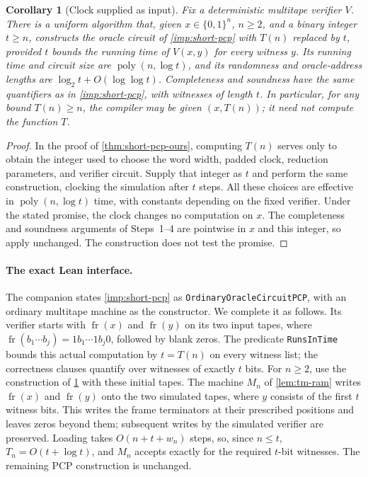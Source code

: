\documentclass[11pt,letterpaper]{article}
\newtheorem{corollary}[theorem]{Corollary}
\theoremstyle{definition}
\theoremstyle{remark}
\newcommand{\poly}{\operatorname{poly}}
\begin{document}
\begin{corollary}[Clock supplied as input]\label{cor:short-pcp-clock}
Fix a deterministic multitape verifier \(V\). There is a uniform
algorithm that, given \(x\in\{0,1\}^n\), \(n\ge2\), and a binary integer
\(t\ge n\), constructs the oracle circuit of
\cref{imp:short-pcp} with \(T(n)\) replaced by \(t\), provided \(t\)
bounds the running time of \(V(x,y)\) for every witness \(y\).
Its running time and circuit size are \(\poly(n,\log t)\), and its
randomness and oracle-address lengths are
\(\log_2t+O(\log\log t)\). Completeness and soundness have the same
quantifiers as in \cref{imp:short-pcp}, with witnesses of length \(t\).
In particular, for any bound \(T(n)\ge n\), the compiler may be given
\((x,T(n))\); it need not compute the function \(T\).
\end{corollary}
\begin{proof}
In the proof of \cref{thm:short-pcp-ours}, computing \(T(n)\) serves
only to obtain the integer used to choose the word width, padded
clock, reduction parameters, and verifier circuit. Supply that integer
as \(t\) and perform the same construction, clocking the simulation
after \(t\) steps. All these choices are effective in
\(\poly(n,\log t)\) time, with constants depending on the fixed
verifier. Under the stated promise, the clock changes no computation
on \(x\). The completeness and soundness arguments of Steps~1--4
are pointwise in \(x\) and this integer, so apply unchanged. The
construction does not test the promise.
\end{proof}

\paragraph{The exact Lean interface.}
The companion states \cref{imp:short-pcp} as
\texttt{Ordinary\allowbreak{}Oracle\allowbreak{}Circuit\allowbreak{}PCP}, with an ordinary multitape
machine as the constructor. We complete it as follows. Its verifier starts with
\(\operatorname{fr}(x)\) and \(\operatorname{fr}(y)\) on its two input
tapes, where
\(\operatorname{fr}(b_1\cdots b_j)=1b_1\cdots1b_j0\), followed by blank
zeros. The predicate \texttt{RunsInTime} bounds this actual computation
by \(t=T(n)\) on every witness list; the correctness clauses quantify
over witnesses of exactly \(t\) bits. For \(n\ge2\), use the construction
of \cref{cor:short-pcp-clock} with these initial tapes. The machine
\(M_n\) of \cref{lem:tm-ram} writes \(\operatorname{fr}(x)\) and
\(\operatorname{fr}(y)\) onto the two simulated tapes, where \(y\)
consists of the first \(t\) witness bits. This writes the frame
terminators at their prescribed positions and leaves zeros beyond them;
subsequent writes by the simulated verifier are preserved. Loading takes
\(O(n+t+w_n)\) steps, so, since \(n\le t\), \(T_n=O(t+\log t)\), and
\(M_n\) accepts exactly for the required \(t\)-bit witnesses. The
remaining PCP construction is unchanged.
\end{document}
